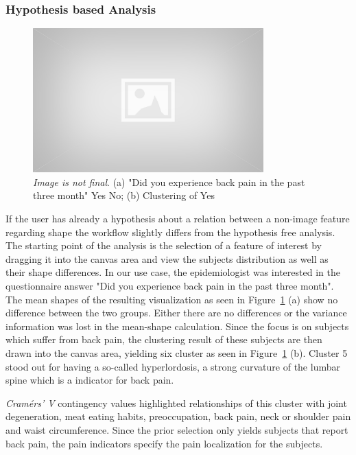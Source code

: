 \documentclass[journal]{style/vgtc} 			          %
\begin{document}
\subsubsection{Hypothesis based Analysis} \label{Hypothesis based Analysis}
\begin{figure}[htb]
 \centering
 \includegraphics[width=3.5in]{figures/placeholder}
 \caption{\emph{Image is not final}. (a) "Did you experience back pain in the past three month" Yes No; (b) Clustering of Yes}
 \label{fig:hypopthesisbased}
\end{figure}
%
If the user has already a hypothesis about a relation between a non-image feature regarding shape the workflow slightly differs from the hypothesis free analysis.
%
The starting point of the analysis is the selection of a feature of interest by dragging it into the canvas area and view the subjects distribution as well as their shape differences.
%
In our use case, the epidemiologist was interested in the questionnaire answer "Did you experience back pain in the past three month".
%
The mean shapes of the resulting visualization as seen in Figure~\ref{fig:hypopthesisbased} (a) show no difference between the two groups.
%
Either there are no differences or the variance information was lost in the mean-shape calculation.
%
Since the focus is on subjects which suffer from back pain, the clustering result of these subjects are then drawn into the canvas area, yielding six cluster as seen in Figure~\ref{fig:hypopthesisbased} (b).
%
Cluster 5 stood out for having a so-called hyperlordosis, a strong curvature of the lumbar spine which is a indicator for back pain.

\emph{Cram\'{e}rs' V} contingency values highlighted relationships of this cluster with joint degeneration, meat eating habits, preoccupation, back pain, neck or shoulder pain and waist circumference.
%
Since the prior selection only yields subjects that report back pain, the pain indicators specify the pain localization for the subjects.
\end{document}
